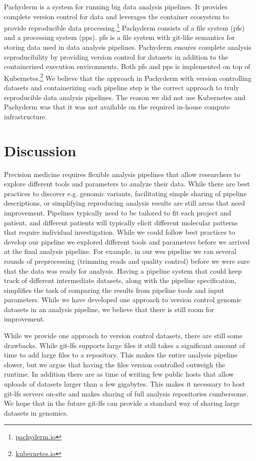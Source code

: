 Pachyderm is a system for running  big data analysis pipelines. It provides
complete version control for data and leverages the container ecosystem to
provide reproducible data processing.\footnote{\url{pachyderm.io}} Pachyderm
consists of a file system (\gls{pfs}) and a processing system (\gls{pps}).
\gls{pfs} is a file system with git-like semantics for storing data used
in data analysis pipelines. Pachyderm ensures complete analysis reproducibility
by providing version control for datasets in addition to the containerized
execution environments. Both \gls{pfs} and \gls{pps} is implemented on top
of Kubernetes.\footnote{\url{kubernetes.io}} We believe that the approach in
Pachyderm with version controlling datasets and containerizing each pipeline
step is the correct approach to truly reproducible data analysis pipelines. 
The reason we did not use Kubernetes and Pachyderm was that it was not available
on the required in-house compute infrastructure.  

\section{Discussion}
Precision medicine requires flexible analysis pipelines that allow researchers
to explore different tools and parameters to analyze their data. While there are
best practices to discover e.g. genomic variants, facilitating simple sharing of
pipeline descriptions, or simplifying reproducing analysis results are still
areas that need improvement. Pipelines typically need 
to be tailored to fit each project and patient, and different patients will
typically elicit different molecular patterns that require individual
investigation. While we could follow best practices to develop our pipeline we
explored different tools and parameters before we arrived at the final analysis
pipeline. 
For example, in our \gls{wes} pipeline we ran several rounds of preprocessing
(trimming reads and quality control) before we were sure that the data was ready
for analysis. Having a pipeline system that could keep track of different
intermediate datasets, along with the pipeline specification, simplifies the
task of comparing the results from pipeline tools and input parameters. While we
have developed one approach to version control genomic datasets in an analysis
pipeline, we believe that there is still room for improvement. 

While we provide one approach to version control datasets, there are still some
drawbacks. While git-lfs supports large files it
still takes a significant amount of time to add large files to a repository.
This makes the entire analysis pipeline slower, but we argue that having the
files version controlled outweigh the runtime. In addition there are as time of
writing few public hosts that allow uploads of datasets larger than a few
gigabytes. This makes it necessary to host git-lfs servers on-site and makes
sharing of full analysis repositories cumbersome. We hope that in the future
git-lfs can provide a standard way of sharing large datasets in genomics. 

